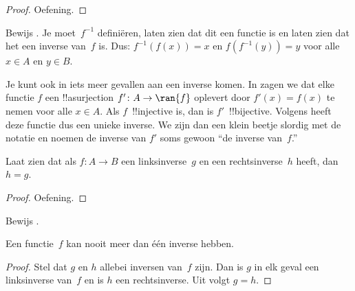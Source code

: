 \documentclass[openany]{memoir}
\begin{document}
\begin{proof}
Oefening.
\end{proof}

\begin{prob}
Bewijs . Je moet~$f^{-1}$
definiëren, laten zien dat dit een functie is en laten zien
dat het een inverse van~$f$ is. Dus: $f^{-1}(f(x)) = x$ en
$f(f^{-1}(y)) = y$ voor alle $x \in A$ en $y \in B$.
\end{prob}

\begin{explain}
Je kunt ook in iets meer gevallen aan een inverse komen. In
 zagen we dat elke functie $f$ een !!a{surjection} $f'
\colon A \to \ran{f}$ oplevert door $f'(x) = f(x)$ te nemen voor alle
$x \in A$. Als $f$~!!{injective} is, dan is $f'$~!!{bijective}.
Volgens  heeft deze functie dus een
unieke inverse. We zijn dan een klein beetje slordig met de notatie en
noemen de inverse van $f'$ soms gewoon ``de inverse van~$f$.''
\end{explain}

\begin{prop}%
  Laat zien dat als $f\colon A \to B$ een linksinverse~$g$ en een
  rechtsinverse~$h$ heeft, dan $h = g$.
\end{prop}

\begin{proof}
  Oefening.
\end{proof}

\begin{prob}
  Bewijs .
\end{prob}

\begin{prop}
Een functie~$f$ kan nooit meer dan één inverse hebben.
\end{prop}

\begin{proof}
  Stel dat $g$ en $h$ allebei inversen van~$f$ zijn. Dan is $g$ in elk
  geval een linksinverse van~$f$ en is $h$ een rechtsinverse. Uit
   volgt $g = h$.
\end{proof}
\endgroup

\begingroup
\def\olfilename{OLP-0025}
\def\olfilepath{content/sets-functions-relations/functions/}
\hypertarget{unit-OLP-0025}{}
\end{document}
